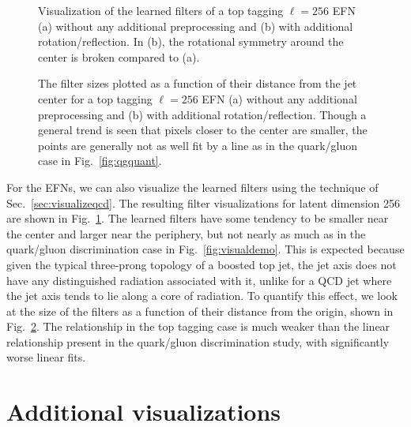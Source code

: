 \documentclass[letterpaper,11pt]{article}
\DeclareRobustCommand{\Sec}[1]{Sec.~\ref{#1}}
\DeclareRobustCommand{\Fig}[1]{Fig.~\ref{#1}}
\begin{document}
\begin{figure}[p]
\centering
{}
\caption{Visualization of the learned filters of a top tagging $\ell = 256$ EFN (a) without any additional preprocessing and (b) with additional rotation/reflection.
%
In (b), the rotational symmetry around the center is broken compared to (a).}
\label{fig:topvisual}
\end{figure}

\begin{figure}[p]
\centering
{}
\caption{The filter sizes plotted as a function of their distance from the jet center for a top tagging $\ell = 256$ EFN (a) without any additional preprocessing and (b) with additional rotation/reflection.
%
Though a general trend is seen that pixels closer to the center are smaller, the points are generally not as well fit by a line as in the quark/gluon case in \Fig{fig:qgquant}.}
\label{fig:topquant}
\end{figure}



For the EFNs, we can also visualize the learned filters using the technique of \Sec{sec:visualizeqcd}.
%
The resulting filter visualizations for latent dimension 256 are shown in \Fig{fig:topvisual}.
%
The learned filters have some tendency to be smaller near the center and larger near the periphery, but not nearly as much as in the quark/gluon discrimination case in \Fig{fig:visualdemo}.
%
This is expected because given the typical three-prong topology of a boosted top jet, the jet axis does not have any distinguished radiation associated with it, unlike for a QCD jet where the jet axis tends to lie along a core of radiation.
%
To quantify this effect, we look at the size of the filters as a function of their distance from the origin, shown in \Fig{fig:topquant}.
%
The relationship in the top tagging case is much weaker than the linear relationship present in the quark/gluon discrimination study, with significantly worse linear fits.

\section{Additional visualizations}
\label{app:addvis}
\end{document}
